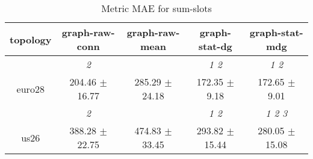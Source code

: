 \begin{table}[h]
\caption{Metric MAE for sum-slots}

        \centering
        \begin{tabular}{
        ccccc} \toprule 
 topology& graph-raw-conn & graph-raw-mean & graph-stat-dg & graph-stat-mdg \\ \toprule
 & \cellcolor[HTML]{EFEFEF} \textit{ 2 }& \cellcolor[HTML]{EFEFEF} & \cellcolor[HTML]{EFEFEF} \textit{ 1 2 }& \cellcolor[HTML]{EFEFEF} \textit{ 1 2 } \\ 
 {euro28}& \cellcolor[HTML]{EFEFEF} 204.46 $\pm$ 16.77& \cellcolor[HTML]{EFEFEF} 285.29 $\pm$ 24.18& \cellcolor[HTML]{EFEFEF} 172.35 $\pm$ 9.18& \cellcolor[HTML]{EFEFEF} 172.65 $\pm$ 9.01 \\ 
& \cellcolor[HTML]{EFEFEF} \textit{ 2 }& \cellcolor[HTML]{EFEFEF} & \cellcolor[HTML]{EFEFEF} \textit{ 1 2 }& \cellcolor[HTML]{EFEFEF} \textit{ 1 2 3 } \\ 
 {us26}& \cellcolor[HTML]{EFEFEF} 388.28 $\pm$ 22.75& \cellcolor[HTML]{EFEFEF} 474.83 $\pm$ 33.45& \cellcolor[HTML]{EFEFEF} 293.82 $\pm$ 15.44& \cellcolor[HTML]{EFEFEF} 280.05 $\pm$ 15.08 \\ 

        \bottomrule
        \end{tabular}%

        \end{table}
        
